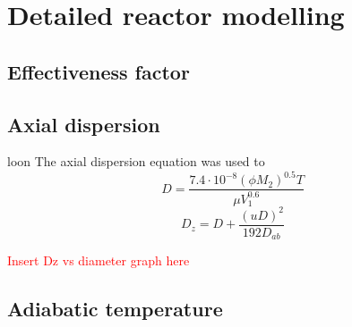 \section{Detailed reactor modelling}
\subsection{Effectiveness factor}

\subsection{Axial dispersion}
loon
The axial dispersion equation was used to 
\begin{equation}
    D=\frac{7.4\cdot10^{-8}(\phi M_2)^{0.5}T}{\mu V_1^{0.6}}
    \label{wilkechang}
\end{equation}
\begin{equation}
    D_z=D+\frac{(uD)^2}{192D_{ab}}
    \label{axial dispersion coefficient}
\end{equation}

\textcolor{red}{Insert Dz vs diameter graph here} 

\subsection{Adiabatic temperature}